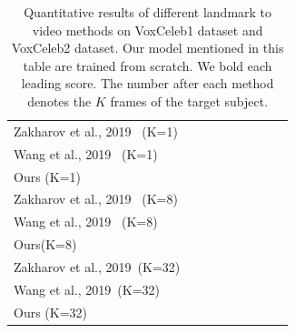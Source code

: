 \documentclass[runningheads]{llncs}
\begin{document}
\begin{table}[t]
\begin{tabular*}{0.98\linewidth}{  l | c c  c c| c c c c }
 {{\scriptsize{Zakharov et al., 2019~\cite{zakharov2019few} (K=1)}}} & {      } &{       } &{      } &     &     &         \\ %
  {{\scriptsize{Wang et al., 2019~\cite{wang2018fewshotvid2vid} (K=1)}}} & { } &{ } &{ } & & &  & {} &{}\\ %
 {{\scriptsize{Ours (K=1)} }}&\bf{   } & \bf{     } &{     } & \bf{      } & \bf{      } &\bf{      }  \\ 
 \hline
 {{\scriptsize{Zakharov et al., 2019~\cite{zakharov2019few} (K=8)}}} & {      } &{       } &{      } &     &     &         \\ %
  {{\scriptsize{Wang et al., 2019~\cite{wang2018fewshotvid2vid} (K=8)}}} & { } &{ } &{ } & & &  & {} &{} \\ %
 {{\scriptsize{Ours(K=8)} }}&\bf{   } & \bf{     } &{     } & \bf{      } & \bf{      } &\bf{      }  \\
 \hline
 {{\scriptsize{Zakharov et al., 2019~\cite{zakharov2019few}(K=32)}}} & {      } &{       } &{      } &     &     &         \\ %
  {{\scriptsize{Wang et al., 2019~\cite{wang2018fewshotvid2vid}(K=32)}}} & { } &{ } &{ } & & &  & {} &{}   \\ %
 {{\scriptsize{Ours (K=32)} }}&\bf{   } & \bf{     } &{     } & \bf{      } & \bf{      } &\bf{      }  \\ 
      \bottomrule
  \end{tabular*}
  \caption{Quantitative results of different landmark to video methods on VoxCeleb1 dataset and VoxCeleb2 dataset. Our model mentioned in this table are trained from scratch. We bold each leading score. The number after each method denotes the $K$ frames of the target subject.}
    \label{tab:lmark_tb}
\end{table}
  
\end{document}
